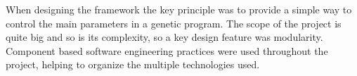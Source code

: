 When designing the framework the key principle was to provide a simple way to control the main parameters in a genetic program.
The scope of the project is quite big and so is its complexity, so a key design feature was modularity. Component based software
engineering practices were used throughout the project, helping to organize the multiple technologies used.
